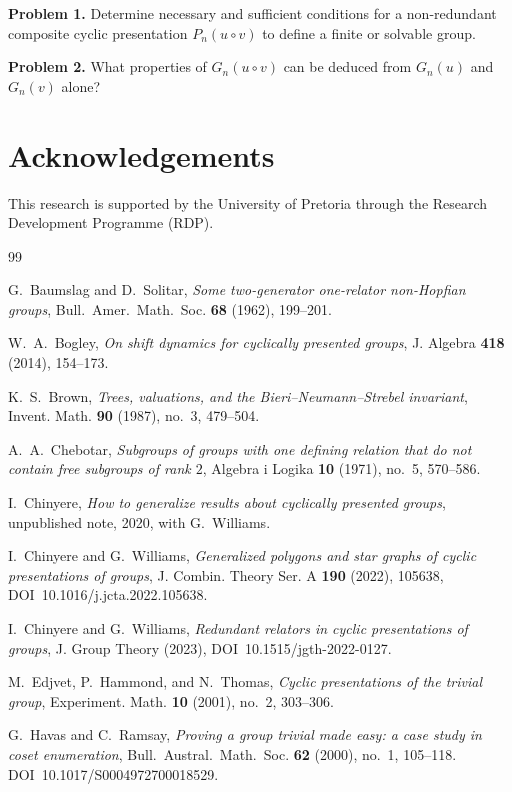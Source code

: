 \documentclass[a4paper,12pt,oneside]{article}
\theoremstyle{definition}
\begin{document}
\medskip
\noindent\textbf{Problem 1.}
Determine necessary and sufficient conditions for a non-redundant composite cyclic presentation \(P_n(u \circ v)\) to define a finite or solvable group.

\medskip
\noindent\textbf{Problem 2.}
What properties of \(G_n(u \circ v)\) can be deduced from \(G_n(u)\) and \(G_n(v)\) alone?
\section*{Acknowledgements}

This research is supported by the University of Pretoria through the Research Development Programme (RDP).
\begin{thebibliography}{99}

G.~Baumslag and D.~Solitar,
\emph{Some two-generator one-relator non-Hopfian groups},
Bull.~Amer.~Math.~Soc. \textbf{68} (1962), 199--201.

W.~A.~Bogley,
\emph{On shift dynamics for cyclically presented groups},
J. Algebra \textbf{418} (2014), 154--173.

K.~S.~Brown,
\emph{Trees, valuations, and the Bieri--Neumann--Strebel invariant},
Invent. Math. \textbf{90} (1987), no.~3, 479--504.

A.~A.~Chebotar,
\emph{Subgroups of groups with one defining relation that do not contain
free subgroups of rank $2$},
Algebra i Logika \textbf{10} (1971), no.~5, 570--586.

I.~Chinyere,
\emph{How to generalize results about cyclically presented groups},
unpublished note, 2020, with G.~Williams.

I.~Chinyere and G.~Williams,
\emph{Generalized polygons and star graphs of cyclic presentations of groups},
J. Combin. Theory Ser. A \textbf{190} (2022), 105638,
DOI~10.1016/j.jcta.2022.105638.

I.~Chinyere and G.~Williams,
\emph{Redundant relators in cyclic presentations of groups},
J. Group Theory (2023), DOI~10.1515/jgth-2022-0127.

M.~Edjvet, P.~Hammond, and N.~Thomas,
\emph{Cyclic presentations of the trivial group},
Experiment. Math. \textbf{10} (2001), no.~2, 303--306.

G.~Havas and C.~Ramsay,
\emph{Proving a group trivial made easy: a case study in coset enumeration},
Bull.~Austral.~Math.~Soc. \textbf{62} (2000), no.~1, 105--118.
DOI~10.1017/S0004972700018529.


\end{thebibliography}
\end{document}

